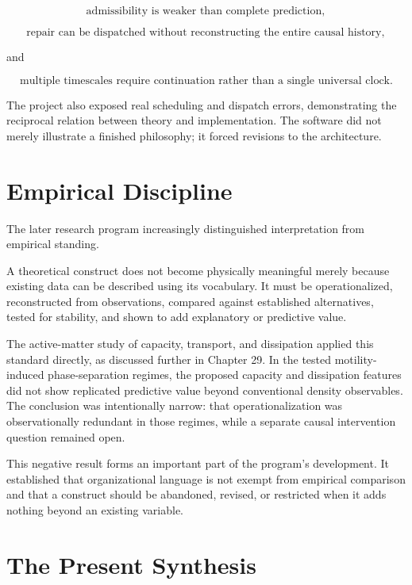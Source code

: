 \documentclass[11pt,oneside]{book}
\numberwithin{equation}{chapter}
\theoremstyle{definition}
\theoremstyle{plain}
\begin{document}
\[
\text{admissibility is weaker than complete prediction},
\]

\[
\text{repair can be dispatched without reconstructing the entire causal history},
\]

and

\[
\text{multiple timescales require continuation rather than a single universal clock}.
\]

The project also exposed real scheduling and dispatch errors, demonstrating
the reciprocal relation between theory and implementation. The software did
not merely illustrate a finished philosophy; it forced revisions to the
architecture.

\section{Empirical Discipline}

The later research program increasingly distinguished interpretation from
empirical standing.

A theoretical construct does not become physically meaningful merely
because existing data can be described using its vocabulary. It must be
operationalized, reconstructed from observations, compared against
established alternatives, tested for stability, and shown to add
explanatory or predictive value.

The active-matter study of capacity, transport, and dissipation applied
this standard directly, as discussed further in Chapter 29. In the tested
motility-induced phase-separation regimes, the proposed capacity and
dissipation features did not show replicated predictive value beyond
conventional density observables. The conclusion was intentionally narrow:
that operationalization was observationally redundant in those regimes,
while a separate causal intervention question remained open.

This negative result forms an important part of the program's development.
It established that organizational language is not exempt from empirical
comparison and that a construct should be abandoned, revised, or restricted
when it adds nothing beyond an existing variable.

\section{The Present Synthesis}
\end{document}

